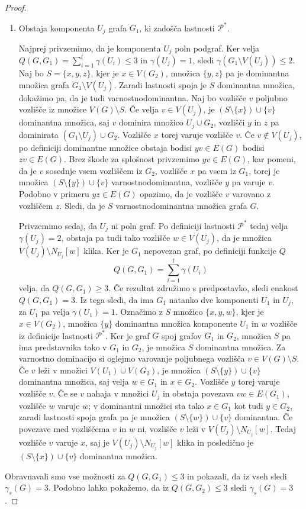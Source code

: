 \documentclass[12pt,a4paper,twoside]{article}
\theoremstyle{definition} %
\theoremstyle{plain} %
\numberwithin{equation}{section}  %
\begin{document}
\begin{proof}
\begin{enumerate}[label=($\roman*$)]
\item Obstaja komponenta $U_j$ grafa $G_1$, ki zadošča lastnosti $\mathcal{P^*}$.

Najprej privzemimo, da je komponenta $U_j$ poln podgraf. Ker velja $Q(G, G_1) = \sum\limits_{i=1}^l \gamma(U_i) \leq 3$ in $\gamma(U_j) = 1$, sledi $\gamma(G_1 \setminus V(U_j)) \leq 2$. Naj bo $S = \{x, y, z\}$, kjer je $x \in V(G_2)$, množica $\{y, z\}$ pa je dominantna množica grafa $G_1 \setminus V(U_j)$. Zaradi lastnosti spoja je $S$ dominantna množica, dokažimo pa, da je tudi varnostnodominantna. Naj bo vozlišče $v$ poljubno vozlišče iz množice $V(G) \setminus S$. Če velja $v \in V(U_j)$, je $(S \setminus \{x\}) \cup \{v\}$ dominantna množica, saj $v$ dominira množico $U_j \cup G_2$, vozlišči $y$ in $z$ pa dominirata $(G_1 \setminus U_j) \cup G_2$. Vozlišče $x$ torej varuje vozlišče $v$. Če $v \not\in V(U_j)$, po definiciji dominantne množice obstaja bodisi $yv \in E(G)$ bodisi $zv \in E(G)$. Brez škode za splošnost privzemimo  $yv \in E(G)$, kar pomeni, da je $v$ sosednje vsem vozliščem iz $G_2$, vozlišče $x$ pa vsem iz $G_1$, torej je množica $(S \setminus \{y\}) \cup \{v\}$ varnostnodominantna, vozlišče $y$ pa varuje $v$. Podobno v primeru $yz \in E(G)$ opazimo, da je vozlišče $v$ varovano z vozliščem $z$. Sledi, da je $S$ varnostnodominantna množica grafa $G$.

Privzemimo sedaj, da $U_j$ ni poln graf. Po definiciji lastnosti $\mathcal{P^*}$ tedaj velja $\gamma(U_j) = 2$, obstaja pa tudi tako vozlišče $w \in V(U_j)$, da je množica $V(U_j) \setminus N_{U_j}[w]$ klika. Ker je $G_1$ nepovezan graf, po definiciji funkcije $Q$ $$Q(G, G_1)= \sum\limits_{i=1}^l \gamma(U_i)$$ velja, da $Q(G, G_1) \geq 3$. Če rezultat združimo s predpostavko, sledi enakost $Q(G, G_1) = 3$. Iz tega sledi, da ima $G_1$ natanko dve komponenti $U_1$ in $U_j$, za $U_1$ pa velja $\gamma(U_1)=1$. Označimo z $S$ množico $\{x, y, w\}$, kjer je $x\in V(G_2)$, množica $\{y\}$ dominantna množica komponente $U_1$ in $w$ vozlišče iz definicije lastnosti $\mathcal{P^*}$. Ker je graf $G$ spoj grafov $G_1$ in $G_2$, množica $S$ pa ima predstavnika tako v $G_1$ in $G_2$, je množica $S$ dominantna množica. Za varnostno dominacijo si oglejmo varovanje poljubnega vozlišča $v \in V(G) \setminus S$. Če $v$ leži v množici $V(U_1) \cup V(G_2)$, je množica $(S \setminus \{y\}) \cup \{v\}$ dominantna množica, saj velja $w\in G_1$ in $x \in G_2$. Vozlišče $y$ torej varuje vozlišče $v$. Če se $v$ nahaja v množici $U_j$ in obstaja povezava $vw \in E(G_1)$, vozlišče $w$ varuje $w$; v dominantni množici sta tako $x\in G_1$ kot tudi $y \in G_2$, zaradi lastnosti spoja grafa pa je množica $(S \setminus \{w\}) \cup \{v\}$ dominantna. Če povezave med vozliščema $v$ in $w$ ni, vozlišče $v$ leži v $V(U_j) \setminus N_{U_j}[w]$. Tedaj vozlišče $v$ varuje $x$, saj je $V(U_j) \setminus N_{U_j}[w]$ klika in posledično je $(S \setminus \{x\}) \cup \{v\}$ dominantna množica.
 \end{enumerate}
Obravnavali smo vse možnosti za $Q(G, G_1) \leq 3$ in pokazali, da iz vseh sledi $\gamma_s(G) = 3$. Podobno lahko pokažemo, da iz  $Q(G, G_2) \leq 3$ sledi $\gamma_s(G) = 3$.
 \end{proof}
 
\end{document}
